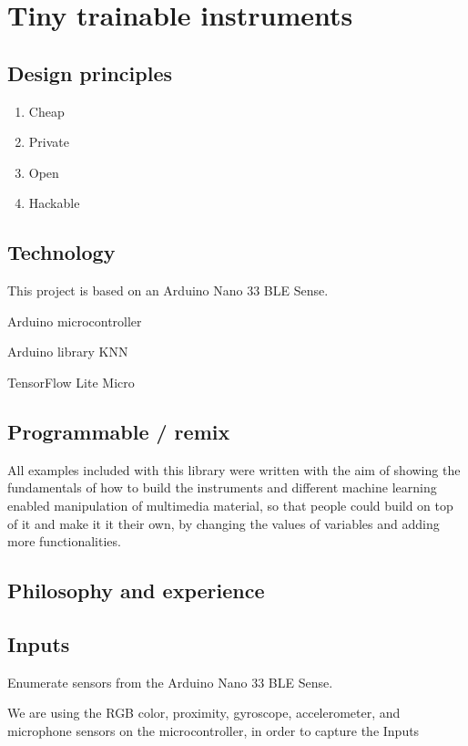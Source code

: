\chapter{Tiny trainable instruments}

\section{Design principles}

\begin{enumerate}
  \item Cheap
  \item Private
  \item Open
  \item Hackable
\end{enumerate}

\section{Technology}

This project is based on an Arduino Nano 33 BLE Sense.

Arduino microcontroller

Arduino library KNN

TensorFlow Lite Micro

\section{Programmable / remix}

All examples included with this library were written with the aim of showing the fundamentals of how to build the instruments and different machine learning enabled manipulation of multimedia material, so that people could build on top of it and make it it their own, by changing the values of variables and adding more functionalities.

\section{Philosophy and experience}

\section{Inputs}

Enumerate sensors from the Arduino Nano 33 BLE Sense.

We are using the RGB color, proximity, gyroscope, accelerometer, and microphone sensors on the microcontroller, in order to capture the Inputs

